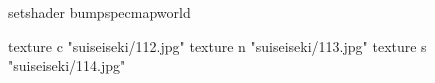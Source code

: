setshader bumpspecmapworld

    texture c "suiseiseki/112.jpg"
    texture n "suiseiseki/113.jpg"
    texture s "suiseiseki/114.jpg"
